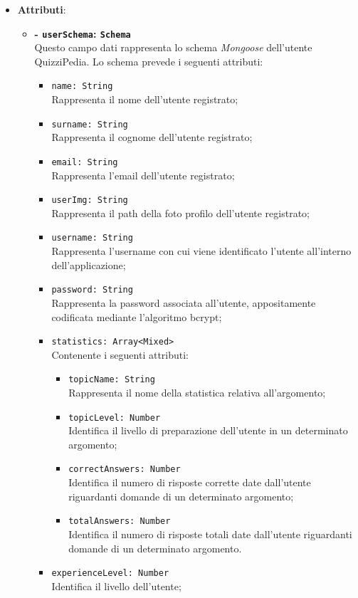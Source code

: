 \begin{itemize}
\begin{itemize}
		\end{itemize}
	\item \textbf{Attributi}: 
		\begin{itemize}
			\item \textbf{- \texttt{userSchema}: \texttt{Schema}} \\
			Questo campo dati rappresenta lo schema \textit{Mongoose} dell'utente QuizziPedia. Lo schema prevede i seguenti attributi:
			\begin{itemize}
				\item 
					\texttt{name: String}\\ Rappresenta il nome  dell'utente registrato;
				\item 
					\texttt{surname: String}\\ Rappresenta il cognome  dell'utente registrato;
				\item 
					\texttt{email: String}\\ Rappresenta l'email  dell'utente registrato;
				\item 
					\texttt{userImg: String}\\ Rappresenta il path della foto profilo dell'utente registrato;
				\item 
					\texttt{username: String}\\ Rappresenta l'username con cui viene identificato l'utente all'interno dell'applicazione;		
				\item
					\texttt{password: String}\\ Rappresenta la password associata all'utente,  appositamente codificata mediante l'algoritmo bcrypt;  		
				\item
					\texttt{statistics: Array<Mixed>}\\ Contenente i seguenti attributi:
				\begin{itemize}
					\item
						\texttt{topicName: String}\\ Rappresenta il nome della statistica relativa all'argomento;	 
					\item
						 \texttt{topicLevel: Number}\\ Identifica il livello di preparazione dell'utente in un determinato argomento;
					\item
						\texttt{correctAnswers: Number}\\ Identifica il numero di risposte corrette date dall'utente riguardanti domande di un determinato argomento; 
					\item						
						 \texttt{totalAnswers: Number} \\ Identifica il numero di risposte totali date dall'utente riguardanti domande di un determinato argomento.		
				\end{itemize}		
				\item 
					\texttt{experienceLevel: Number}\\ Identifica il livello dell'utente;				
				

\end{itemize}
\end{itemize}
\end{itemize}
